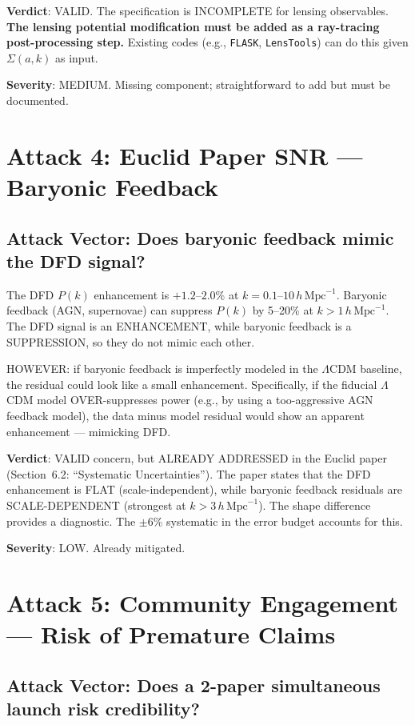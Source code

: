 \documentclass[11pt,a4paper]{article}
\begin{document}
\textbf{Verdict}: VALID. The specification is INCOMPLETE for lensing observables. \textbf{The lensing potential modification must be added as a ray-tracing post-processing step.} Existing codes (e.g., \texttt{FLASK}, \texttt{LensTools}) can do this given $\Sigma(a,k)$ as input.

\textbf{Severity}: MEDIUM. Missing component; straightforward to add but must be documented.

\section{Attack 4: Euclid Paper SNR --- Baryonic Feedback}

\subsection{Attack Vector: Does baryonic feedback mimic the DFD signal?}

The DFD $P(k)$ enhancement is $+1.2$--$2.0\%$ at $k = 0.1$--$10\,h\,\mathrm{Mpc}^{-1}$. Baryonic feedback (AGN, supernovae) can suppress $P(k)$ by 5--20\% at $k > 1\,h\,\mathrm{Mpc}^{-1}$. The DFD signal is an ENHANCEMENT, while baryonic feedback is a SUPPRESSION, so they do not mimic each other.

HOWEVER: if baryonic feedback is imperfectly modeled in the $\Lambda$CDM baseline, the residual could look like a small enhancement. Specifically, if the fiducial $\Lambda$CDM model OVER-suppresses power (e.g., by using a too-aggressive AGN feedback model), the data minus model residual would show an apparent enhancement --- mimicking DFD.

\textbf{Verdict}: VALID concern, but ALREADY ADDRESSED in the Euclid paper (Section~6.2: ``Systematic Uncertainties''). The paper states that the DFD enhancement is FLAT (scale-independent), while baryonic feedback residuals are SCALE-DEPENDENT (strongest at $k > 3\,h\,\mathrm{Mpc}^{-1}$). The shape difference provides a diagnostic. The $\pm 6\%$ systematic in the error budget accounts for this.

\textbf{Severity}: LOW. Already mitigated.

\section{Attack 5: Community Engagement --- Risk of Premature Claims}

\subsection{Attack Vector: Does a 2-paper simultaneous launch risk credibility?}
\end{document}
